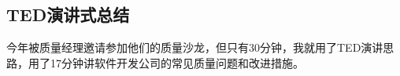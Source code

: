 \hypertarget{tedux6f14ux8bb2ux5f0fux603bux7ed3}{%
\subsection{TED演讲式总结}\label{tedux6f14ux8bb2ux5f0fux603bux7ed3}}

今年被质量经理邀请参加他们的质量沙龙，但只有30分钟，我就用了TED演讲思路，用了17分钟讲软件开发公司的常见质量问题和改进措施。

